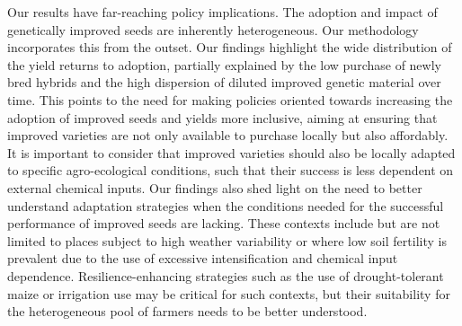 \documentclass[11pt]{article}
\begin{document}
Our results have far-reaching policy implications. The adoption and impact of genetically improved seeds are inherently heterogeneous. Our methodology incorporates this from the outset. Our findings highlight the wide distribution of the yield returns to adoption, partially explained by the low purchase of newly bred hybrids and the high dispersion of diluted improved genetic material over time. This points to the need for making policies oriented towards increasing the adoption of improved seeds and yields more inclusive, aiming at ensuring that improved varieties are not only available to purchase locally but also affordably. It is important to consider that improved varieties should also be locally adapted to specific agro-ecological conditions, such that their success is less dependent on external chemical inputs. Our findings also shed light on the need to better understand adaptation strategies when the conditions needed for the successful performance of improved seeds are lacking. These contexts include but are not limited to places subject to high weather variability or where low soil fertility is prevalent due to the use of excessive intensification and chemical input dependence. Resilience-enhancing strategies such as the use of drought-tolerant maize or irrigation use may be critical for such contexts, but their suitability for the heterogeneous pool of farmers needs to be better understood. 


\end{document}
